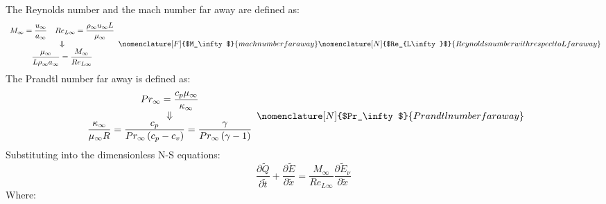 \documentclass[11pt, a4paper]{article}
\newcommand{\parder}[2]{\frac{\partial {#1}}{\partial {#2}}}
\begin{document}
The Reynolds number and the mach number far away are defined as:
\begin{equation}
    \begin{array}{c}
        \begin{matrix}
            \displaystyle M_\infty=\frac{u_\infty}{a_\infty} & \displaystyle Re_{L\infty}=\frac{\rho_\infty u_\infty L}{\mu_\infty}
        \end{matrix} \\
        \Downarrow \\
        \displaystyle \frac{\mu_\infty}{L\rho_\infty a_\infty}=\frac{M_\infty}{Re_{L\infty}}
    \end{array}
    \nomenclature[F]{$M_\infty$}{mach number far away}
    \nomenclature[N]{$Re_{L\infty}$}{Reynolds number with respect to L far away}
\end{equation}
The Prandtl number far away is defined as:
\begin{equation}
    \begin{array}{c}
        \displaystyle Pr_\infty=\frac{c_p\mu_\infty}{\kappa_\infty} \\
        \Downarrow \\
        \displaystyle\frac{\kappa_\infty}{\mu_\infty R}=\frac{c_p}{Pr_\infty \left(c_p-c_v\right)}=\frac{\gamma}{Pr_\infty\left(\gamma-1\right)}
    \end{array}
    \nomenclature[N]{$Pr_\infty$}{Prandtl number far away}
\end{equation}
Substituting into the dimensionless N-S equations:
\begin{equation}
    \parder{\tilde{Q}}{\tilde{t}}+\parder{\tilde{E}}{\tilde{x}}=\frac{M_\infty}{Re_{L\infty}}\parder{\tilde{E}_\nu}{\tilde{x}}
\end{equation}
Where:
\end{document}
